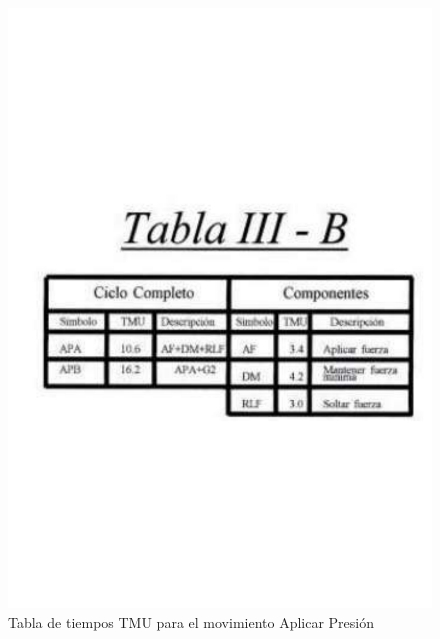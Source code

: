     \begin{figure}[H]
        \centering
        \includegraphics[trim = {20mm 40mm 20mm 25mm},clip,scale=0.25]{9/Img/tablaB.pdf}
        \caption{ Tabla de tiempos TMU para el movimiento Aplicar Presión }
        \label{fig:bimanual}
    \end{figure}
    
